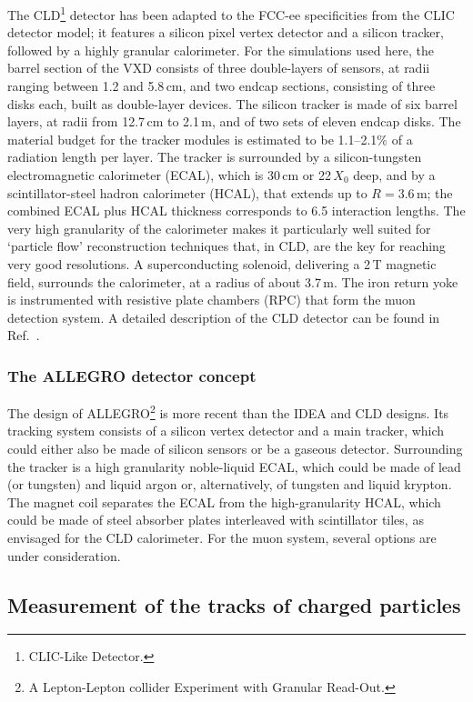 The CLD\footnote{CLIC-Like Detector.}
detector has been adapted to the FCC-ee specificities from the CLIC detector model; 
it features a silicon pixel vertex detector and a silicon tracker, followed by a highly granular calorimeter. 
For the simulations used here, the barrel section of the VXD consists of three double-layers of sensors, at radii ranging between 1.2 and 5.8\,cm, 
and two endcap sections, consisting of three disks each, built as double-layer devices. 
The silicon tracker is made of six barrel layers, at radii from 12.7\,cm to 2.1\,m, and of two sets of eleven endcap disks. 
The material budget for the tracker modules is estimated to be 1.1--2.1\% of a radiation length per layer. 
The tracker is surrounded by a silicon-tungsten electromagnetic calorimeter (ECAL), which is 30\,cm or 22\,$X_0$ deep, 
and by a scintillator-steel hadron calorimeter (HCAL), that extends up to $R = 3.6$\,m; 
the combined ECAL plus HCAL thickness corresponds to 6.5 interaction lengths. 
The very high granularity of the calorimeter makes it particularly well suited for `particle flow' reconstruction techniques that, 
in CLD, are the key for reaching very good resolutions. 
A superconducting solenoid, delivering a 2\,T magnetic field, surrounds the calorimeter, at a radius of about 3.7\,m.  
The iron return yoke is instrumented with resistive plate chambers (RPC) that form the muon detection system. 
A detailed description of the CLD detector can be found in Ref.~\cite{Bacchetta:2019fmz}.

\subsubsection{The ALLEGRO detector concept}

The design of ALLEGRO\footnote{A Lepton-Lepton collider Experiment with Granular Read-Out.} 
is more recent than the IDEA and CLD designs. 
Its tracking system consists of a silicon vertex detector and a main tracker, which could either also be made of silicon sensors or be a gaseous detector. 
Surrounding the tracker is a high granularity noble-liquid ECAL, 
which could be made of lead (or tungsten) and liquid argon or, alternatively, of tungsten and liquid krypton. 
The magnet coil separates the ECAL from the high-granularity HCAL, 
which could be made of steel absorber plates interleaved with scintillator tiles, as envisaged for the CLD calorimeter. 
For the muon system, several options are under consideration.

\subsection{Measurement of the tracks of charged particles}
\label{sec:ch_part_tracking}

